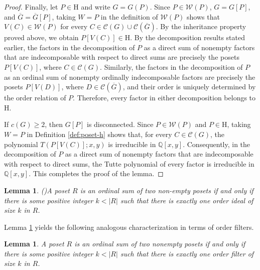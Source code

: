 \documentclass[11pt,a4paper]{article}
\newtheorem{lemma}[theorem]{Lemma}
\begin{document}
\begin{proof}
Finally, let $P\in\mathrm H$ and write $G=G(P)$.
Since $P\in\mathcal W(P)$, $G=G[P]$, and $\overline G=\overline G[P]$,
taking $W=P$ in the definition of $\mathcal W(P)$ shows that $V(C)\in\mathcal W(P)$ 
for every $C\in\mathcal C(G)\cup\mathcal C(\overline G)$.
By the inheritance property proved above, we obtain $P[V(C)]\in\mathrm H$.
By the decomposition results stated earlier, the factors in the decomposition of $P$ 
as a direct sum of nonempty factors that are indecomposable with respect
to direct sums are precisely the posets $P[V(C)]$, where $C\in\mathcal C(G)$.
Similarly, the factors in the decomposition of $P$ as an ordinal sum 
of nonempty ordinally indecomposable factors are precisely the posets $P[V(D)]$,
where $D\in\mathcal C(\overline G)$,
and their order is uniquely determined by the order relation of $P$.
Therefore, every factor in either decomposition belongs to $\mathrm H$.

If $c(G)\geq 2$, then $G[P]$ is disconnected. Since $P\in\mathcal W(P)$ and $P\in\mathrm H$,
taking $W=P$ in Definition \ref{def:poset-h} shows that,  for every $C\in\mathcal C(G)$,
the polynomial $T(P[V(C)];x,y)$ is irreducible in $\mathbb Q[x,y]$.
Consequently, in the decomposition of $P$ as a direct sum of nonempty factors 
that are indecomposable with respect to direct sums, 
the Tutte polynomial of every factor is irreducible in $\mathbb Q[x,y]$.
This completes the proof of the lemma.
\end{proof}

\begin{lemma}(\cite{Gordon1996})\label{lem:leantichain}
A poset $R$ is an ordinal sum of two non-empty posets if and only if 
there is some positive integer $k < |R|$ such that 
there is exactly one order ideal of size $k$ in $R$.
\end{lemma}

Lemma \ref{lem:leantichain} yields the following analogous
characterization in terms of order filters.

\begin{lemma}\label{lem:unique-filter}
A poset $R$ is an ordinal sum of two nonempty posets if and only if 
there is some positive integer $k<|R|$ such that 
there is exactly one order filter of size $k$ in $R$.
\end{lemma}
\end{document}
